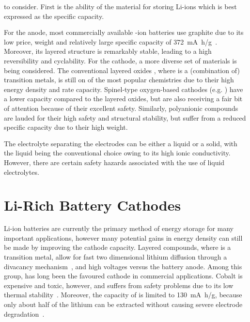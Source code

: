 \begin{refsection}
to consider. First is the ability of the material for storing Li-ions which is 
best expressed as the specific capacity. 
 
For the anode, most commercially available -ion batteries use graphite 
due to its low price, weight and relatively large specific capacity of 
372~\si{\milli\ampere\hour/\gram}~\cite{Mao2018}. Moreover, its layered 
structure is remarkably stable, leading to  a high reversibility and 
cyclability. For the cathode, a more diverse set of materials is being 
considered. The conventional layered oxides , where  is a 
(combination of) transition metals, is still on of the most popular 
chemistries due to their high energy density and rate capacity. Spinel-type 
oxygen-based cathodes (e.g. ) have a lower capacity compared to 
the layered oxides, but are also receiving a fair bit of attention because of 
their excellent safety. Similarly, polyanionic compounds are lauded for their 
high safety and structural stability, but suffer from a reduced specific 
capacity due to their high weight. 
 
The electrolyte separating the electrodes can be either a liquid or a solid, 
with the liquid being the conventional choice owing to its high ionic 
conductivity. However, there are certain safety hazards associated with the 
use of liquid electrolytes.  
 
 
 
\section{Li-Rich Battery Cathodes} \label{batteries:sec-lirich} 
 
Li-ion batteries are currently the primary method of energy storage for many 
important applications, however many potential gains in energy density can 
still be made by improving the cathode capacity. Layered  compounds, 
where  is a transition metal, allow for fast two dimensional lithium 
diffusion through a divacancy mechanism~\cite{VanderVen2001}, and high 
voltages versus the battery anode. Among this group,  has long been 
the favoured cathode in commercial applications. Cobalt is expensive and 
toxic, however, and suffers from safety problems due to its low thermal 
stability~\cite{Larcher2015}. Moreover, the capacity of  is limited 
to 130~\si{\milli\ampere\hour/\gram}, because only about half of the lithium 
can be extracted without causing severe electrode 
degradation~\cite{Rozier2015}. 
 

\end{refsection}
